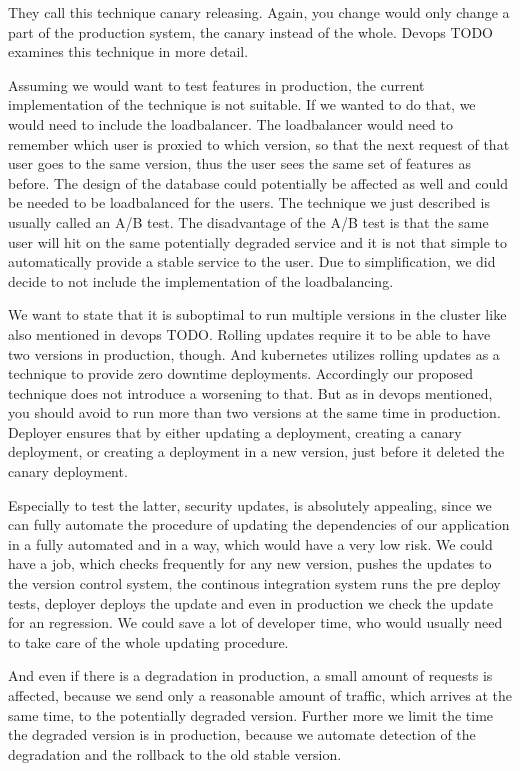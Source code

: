 They call this technique canary releasing. Again, you change would only change a part of
the production system, the canary instead of the whole. Devops TODO examines this
technique in more detail.

Assuming we would want to test features in production, the current implementation of the
technique is not suitable. If we wanted to do that, we would need to include the
loadbalancer. The loadbalancer would need to remember which user is proxied to which
version, so that the next request of that user goes to the same version, thus the user
sees the same set of features as before. The design of the database could potentially be
affected as well and could be needed to be loadbalanced for the users. The technique we
just described is usually called an A/B test. The disadvantage of the A/B test is that the
same user will hit on the same potentially degraded service and it is not that simple to
automatically provide a stable service to the user. Due to simplification, we did decide
to not include the implementation of the loadbalancing.

We want to state that it is suboptimal to run multiple versions in the cluster like also
mentioned in devops TODO. Rolling updates require it to be able to have two versions in
production, though. And kubernetes utilizes rolling updates as a technique to provide zero
downtime deployments. Accordingly our proposed technique does not introduce a worsening to
that. But as in devops mentioned, you should avoid to run more than two versions at the
same time in production. Deployer ensures that by either updating a deployment, creating a
canary deployment, or creating a deployment in a new version, just before it deleted the
canary deployment.

Especially to test the latter, security updates, is absolutely appealing, since we can
fully automate the procedure of updating the dependencies of our application in a fully
automated and in a way, which would have a very low risk. We could have a job, which
checks frequently for any new version, pushes the updates to the version control system,
the continous integration system runs the pre deploy tests, deployer deploys the update
and even in production we check the update for an regression. We could save a lot of
developer time, who would usually need to take care of the whole updating procedure.

And even if there is a degradation in production, a small amount of requests is affected,
because we send only a reasonable amount of traffic, which arrives at the same time, to
the potentially degraded version. Further more we limit the time the degraded version is
in production, because we automate detection of the degradation and the rollback to the
old stable version.


